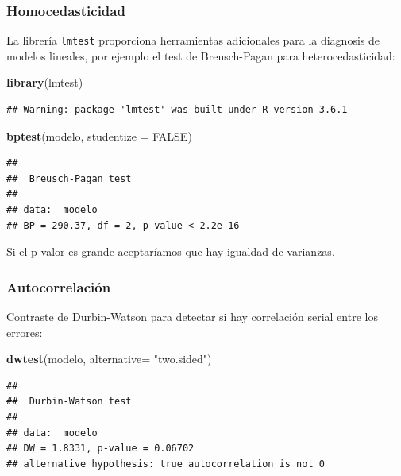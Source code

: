 \documentclass[]{book}
\newenvironment{Shaded}{\begin{snugshade}}{\end{snugshade}}
\newcommand{\DataTypeTok}[1]{\textcolor[rgb]{0.13,0.29,0.53}{#1}}
\newcommand{\KeywordTok}[1]{\textcolor[rgb]{0.13,0.29,0.53}{\textbf{#1}}}
\newcommand{\NormalTok}[1]{#1}
\newcommand{\OtherTok}[1]{\textcolor[rgb]{0.56,0.35,0.01}{#1}}
\newcommand{\StringTok}[1]{\textcolor[rgb]{0.31,0.60,0.02}{#1}}
\begin{document}
\hypertarget{homocedasticidad}{%
\subsubsection{Homocedasticidad}\label{homocedasticidad}}

La librería \texttt{lmtest} proporciona herramientas adicionales para la diagnosis de modelos lineales, por ejemplo el test de Breusch-Pagan para heterocedasticidad:

\begin{Shaded}
\begin{Highlighting}[]
\KeywordTok{library}\NormalTok{(lmtest)}
\end{Highlighting}
\end{Shaded}

\begin{verbatim}
## Warning: package 'lmtest' was built under R version 3.6.1
\end{verbatim}

\begin{Shaded}
\begin{Highlighting}[]
\KeywordTok{bptest}\NormalTok{(modelo, }\DataTypeTok{studentize =} \OtherTok{FALSE}\NormalTok{)}
\end{Highlighting}
\end{Shaded}

\begin{verbatim}
## 
##  Breusch-Pagan test
## 
## data:  modelo
## BP = 290.37, df = 2, p-value < 2.2e-16
\end{verbatim}

Si el p-valor es grande aceptaríamos que hay igualdad de varianzas.

\hypertarget{autocorrelacion}{%
\subsubsection{Autocorrelación}\label{autocorrelacion}}

Contraste de Durbin-Watson para detectar si hay correlación serial entre los errores:

\begin{Shaded}
\begin{Highlighting}[]
\KeywordTok{dwtest}\NormalTok{(modelo, }\DataTypeTok{alternative=} \StringTok{"two.sided"}\NormalTok{)}
\end{Highlighting}
\end{Shaded}

\begin{verbatim}
## 
##  Durbin-Watson test
## 
## data:  modelo
## DW = 1.8331, p-value = 0.06702
## alternative hypothesis: true autocorrelation is not 0
\end{verbatim}
\end{document}
